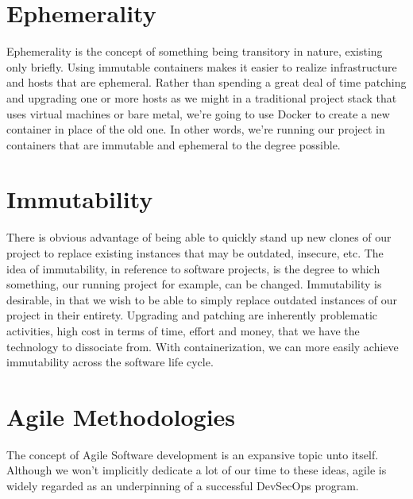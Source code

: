 \section{Ephemerality}

\justify
Ephemerality is the concept of something being transitory in nature,
existing only briefly.
Using immutable containers makes it easier to realize infrastructure and
hosts that are ephemeral. Rather than spending a great deal of time
patching and upgrading one or more hosts as we might in a traditional
project stack that uses virtual machines or bare metal, we're going to
use Docker to create a new container in place of the old one. In other
words, we're running our project in containers that are immutable and
ephemeral to the degree possible.

\section{Immutability}

\justify
There is obvious advantage of being able to quickly stand up new clones
of our project to replace existing instances that may be outdated,
insecure, etc. The idea of immutability,
in reference to software projects, is the degree to which something, our
running project for example, can be changed. Immutability is desirable,
in that we wish to be able to simply replace outdated instances of our
project in their entirety. Upgrading and patching are inherently
problematic activities, high cost in terms of time, effort and money,
that we have the technology to dissociate from. With containerization,
we can more easily achieve immutability across the software life cycle.

\section{Agile Methodologies}

\justify
The concept of Agile Software development is an expansive topic
unto itself. Although we won't implicitly dedicate a lot of our time to these
ideas, agile is widely regarded as an underpinning of a successful
DevSecOps program.
